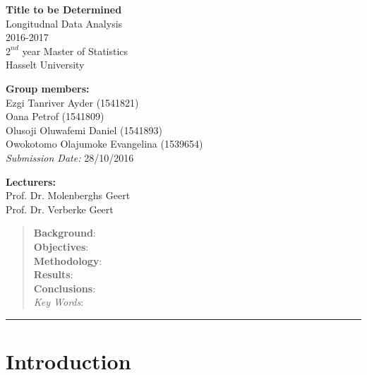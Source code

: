 \documentclass[11pt]{article}\usepackage[]{graphicx}\usepackage[]{color}
\begin{document}
\clearpage\thispagestyle{empty}

\begin{center}
	\textbf{\huge{Title to be Determined}} \\[1.5cm]
	\Large{
	Longitudnal Data Analysis \\
	2016-2017 \\[0.5cm]
	$2^{nd}$ year Master of Statistics \\
	Hasselt University	
	}
\end{center}

\vspace*{1cm}
\textbf{\large{Group members:}}\\
Ezgi Tanriver Ayder (1541821) \\
Oana Petrof (1541809) \\
Olusoji Oluwafemi Daniel (1541893) \\
Owokotomo Olajumoke Evangelina (1539654) \\[0.5cm]

\noindent\textit{Submission Date:} 28/10/2016

\vspace*{3cm}
\textbf{\large{Lecturers:}}\\
Prof. Dr. Molenberghs Geert  \\
Prof. Dr.  Verberke Geert


\newpage \setcounter{page}{1}

\begin{abstract}
\noindent\textbf{Background}:  \\

\noindent\textbf{Objectives}:  \\

\noindent\textbf{Methodology}:  \\

\noindent\textbf{Results}:   \\

\noindent\textbf{Conclusions}:  \\

\noindent\textit{Key Words}: 

\end{abstract}
\rule{\textwidth}{0.4pt}


\section{Introduction}\label{introduction}
\end{document}
